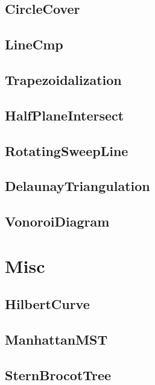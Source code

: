 \subsection{CircleCover}

\subsection{LineCmp}

\subsection{Trapezoidalization}

\subsection{HalfPlaneIntersect}

\subsection{RotatingSweepLine}

\subsection{DelaunayTriangulation}

\subsection{VonoroiDiagram}

\section{Misc}
\subsection{HilbertCurve}

\subsection{ManhattanMST}

\subsection{SternBrocotTree}

